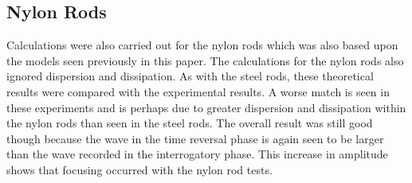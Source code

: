  \subsection{Nylon Rods}
 Calculations were also carried out for the nylon rods which was also based upon the models seen previously in this paper. The calculations for the nylon rods also ignored dispersion and dissipation. As with the steel rods, these theoretical results were compared with the experimental results. A worse match is seen in these experiments and is perhaps due to greater dispersion and dissipation within the nylon rods than seen in the steel rods. The overall result was still good though because the wave in the time reversal phase is again seen to be larger than the wave recorded in the interrogatory phase. This increase in amplitude shows that focusing occurred with the nylon rod tests.
 
